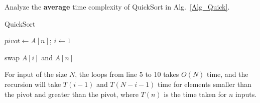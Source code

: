 \begin{exercise}[]{Analyze the \textbf{average} time complexity of QuickSort in Alg.~\ref{Alg_Quick}.

  \begin{minipage}[t]{0.8\textwidth}
  \begin{algorithm}[H]

    \BlankLine
    \caption{QuickSort}\label{Alg_Quick}


    $pivot \leftarrow A[n]$; $i \leftarrow 1$\;

    swap $A[i]$ and $A[n]$\;
  \end{algorithm}
  \end{minipage}
  }
  \begin{solution}
  For input of the size $N$, the loops from line 5 to 10 takes $O(N)$ time, and the recursion will take $T(i-1)$ and $T(N-i-1)$ time for elements smaller than the pivot and greater than the pivot, where $T(n)$ is the time taken for $n$ inputs.


\end{solution}
\end{exercise}
